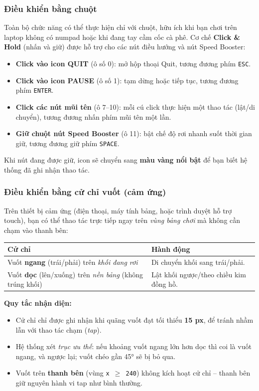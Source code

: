 \documentclass[12pt,a4paper]{article}
\begin{document}
\subsubsection{Điều khiển bằng chuột}
Toàn bộ chức năng có thể thực hiện chỉ với chuột, hữu ích khi bạn chơi trên laptop không có numpad hoặc khi đang tay cầm cốc cà phê.
Cơ chế \textbf{Click \& Hold} (nhấn và giữ) được hỗ trợ cho các nút điều hướng và nút Speed Booster:
\begin{itemize}
    \item \textbf{Click vào icon QUIT} (ô số 0): mở hộp thoại Quit, tương đương phím \texttt{ESC}.
    \item \textbf{Click vào icon PAUSE} (ô số 1): tạm dừng hoặc tiếp tục, tương đương phím \texttt{ENTER}.
    \item \textbf{Click các nút mũi tên} (ô 7--10): mỗi cú click thực hiện một thao tác (lật/di chuyển), tương đương nhấn phím mũi tên một lần.
    \item \textbf{Giữ chuột nút Speed Booster} (ô 11): bật chế độ rơi nhanh suốt thời gian giữ, tương đương giữ phím \texttt{SPACE}.
\end{itemize}

Khi nút đang được giữ, icon sẽ chuyển sang \textbf{màu vàng nổi bật} để bạn biết hệ thống đã ghi nhận thao tác.
\subsubsection{Điều khiển bằng cử chỉ vuốt (cảm ứng)}
Trên thiết bị cảm ứng (điện thoại, máy tính bảng, hoặc trình duyệt hỗ trợ touch), bạn có thể thao tác trực tiếp ngay trên \textit{vùng bảng chơi} mà không cần chạm vào thanh bên:

\vspace{4pt}
\begin{tabularx}{\linewidth}{|l|X|}
    \hline
    \textbf{Cử chỉ} & \textbf{Hành động} \\
    \hline
    Vuốt \textbf{ngang} (trái/phải) trên \textit{khối đang rơi} & Di chuyển khối sang trái/phải.
\\
    \hline
    Vuốt \textbf{dọc} (lên/xuống) trên \textit{nền bảng} (không trúng khối) & Lật khối ngược/theo chiều kim đồng hồ.
\\
    \hline
\end{tabularx}

\vspace{4pt}
\noindent\textbf{Quy tắc nhận diện:}
\begin{itemize}
    \item Cử chỉ chỉ được ghi nhận khi quãng vuốt đạt tối thiểu \textbf{15 px}, để tránh nhầm lẫn với thao tác chạm (\textit{tap}).
    \item Hệ thống xét \textit{trục ưu thế}: nếu khoảng vuốt ngang lớn hơn dọc thì coi là vuốt ngang, và ngược lại;
vuốt chéo gần 45° sẽ bị bỏ qua.
    \item Vuốt trên \textbf{thanh bên} (vùng \texttt{x $\geq$ 240}) không kích hoạt cử chỉ -- thanh bên giữ nguyên hành vi tap như bình thường.
\end{itemize}
\end{document}
